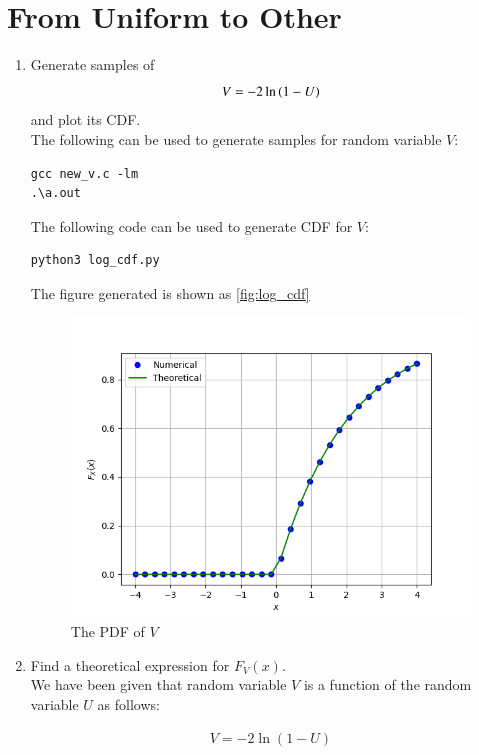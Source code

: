 \documentclass[journal,12pt,twocolumn]{IEEEtran}
\renewcommand\thesection{\arabic{section}}
\begin{document}
\section{From Uniform to Other}
\begin{enumerate}[label=\thesection.\arabic*
,ref=\thesection.\theenumi]
%
\item
Generate samples of 
%
\begin{equation}
V = -2\ln\left(1-U\right)
\end{equation}
%
and plot its CDF.
\\
\solution
The following can be used to generate samples for random variable $V$:
\begin{lstlisting}
gcc new_v.c -lm
.\a.out
\end{lstlisting}

The following code can be used to generate CDF for $V$:
\begin{lstlisting}
python3 log_cdf.py
\end{lstlisting}
The figure generated is shown as \eqref{fig:log_cdf}

\begin{figure}
\centering
\includegraphics[width=\columnwidth]{../figs/log_cdf.png}
\caption{The PDF of $V$}
\label{fig:log_cdf}
\end{figure}
  
\item Find a theoretical expression for $F_V(x)$.
\\
\solution
We have been given that random variable $V$ is a function of the random variable $U$ as follows:
	
	\begin{align}
		V = -2\ln{(1 - U)}
		\label{eq:FuncRV}
	\end{align}


\end{enumerate}
\end{document}
